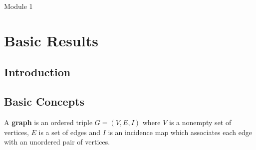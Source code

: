 

{\Large Module 1}
\section{Basic Results}
\subsection{Introduction}
\cite{balakrishnan}
\subsection{Basic Concepts}
\begin{definition}
	A \textbf{graph} is an ordered triple $G = (V,E,I)$ where $V$ is a nonempty set of vertices, $E$ is a set of edges and $I$ is an incidence map which associates each edge with an unordered pair of vertices.
\end{definition}


